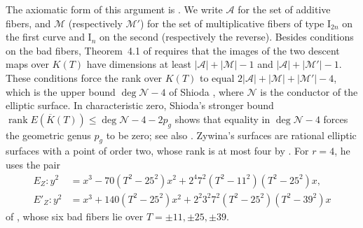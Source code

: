 \documentclass[12pt,oneside,openany]{book}
\theoremstyle{definition}
\theoremstyle{plain}
\numberwithin{equation}{chapter}
\theoremstyle{plain}
\theoremstyle{definition}
\theoremstyle{remark}
\DeclareMathOperator{\rk}{rank}
\begin{document}
The axiomatic form of this argument is \cite[Theorem~4.1]{Zywina2026}. We write $\mathcal A$ for the set of additive fibers, and $\mathcal M$ (respectively $\mathcal M'$) for the set of multiplicative fibers of type $\mathrm I_{2n}$ on the first curve and $\mathrm I_n$ on the second (respectively the reverse). Besides conditions on the bad fibers, Theorem~4.1 of \cite{Zywina2026} requires that the images of the two descent maps over $K(T)$ have dimensions at least $|\mathcal A|+|\mathcal M|-1$ and $|\mathcal A|+|\mathcal M'|-1$. These conditions force the rank over $K(T)$ to equal $2|\mathcal A|+|\mathcal M|+|\mathcal M'|-4$, which is the upper bound $\deg\mathcal N-4$ of Shioda \cite[Corollary~2]{Shioda1992}, where $\mathcal N$ is the conductor of the elliptic surface. In characteristic zero, Shioda's stronger bound $\rk E(\overline K(T))\le\deg\mathcal N-4-2p_g$ \cite[Corollary~3, equation~(1.13')]{Shioda1992} shows that equality in $\deg\mathcal N-4$ forces the geometric genus $p_g$ to be zero; see also \cite[\S2]{Zywina2026}. Zywina's surfaces are rational elliptic surfaces with a point of order two, whose rank is at most four by \cite[Corollary~2.1]{OguisoShioda1991}. For $r=4$, he uses the pair
\begin{equation}\label{eq:intro-zywina}
\begin{aligned}
E_Z\colon y^2&=x^3-70(T^2-25^2)x^2+2^4 7^2(T^2-11^2)(T^2-25^2)x,\\
E'_Z\colon y^2&=x^3+140(T^2-25^2)x^2+2^2 3^2 7^2(T^2-25^2)(T^2-39^2)x
\end{aligned}
\end{equation}
of \cite[\S6.5]{Zywina2026}, whose six bad fibers lie over $T=\pm11,\pm25,\pm39$.
\end{document}
